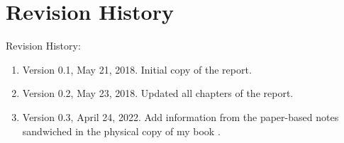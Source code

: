 






\chapter*{Revision History}
\label{chp:revisionhistory}


Revision History: \vspace{-0.3cm}
\begin{enumerate} \itemsep -4pt
\item Version 0.1, May 21, 2018. Initial copy of the report.
\item Version 0.2, May 23, 2018. Updated all chapters of the report.
\item Version 0.3, April 24, 2022. Add information from the paper-based notes sandwiched in the physical copy of my book \cite{Kopka2004}.
\end{enumerate}







